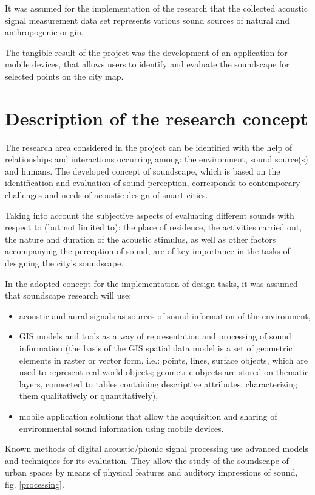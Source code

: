 \documentclass[a4paper,10pt]{article}
\begin{document}
\begin{multicols}{2}
It was assumed for the implementation of the research that the collected
acoustic signal measurement data set represents various sound sources of natural
and anthropogenic origin.

The tangible result of the project was the development of an application for
mobile devices, that allows users to identify and evaluate the soundscape for
selected points on the city map.

\end{multicols}

\section{Description of the research concept}

\begin{multicols}{2}

The research area considered in the project can be identified with the help of
relationships and interactions occurring among: the environment, sound source(s)
and humans. The developed concept of soundscape, which is based on the
identification and evaluation of sound perception, corresponds to contemporary
challenges and needs of acoustic design of smart cities.

Taking into account the subjective aspects of evaluating different sounds with
respect to (but not limited to): the place of residence, the activities carried
out, the nature and duration of the acoustic stimulus, as well as other factors
accompanying the perception of sound, are of key importance in the tasks of
designing the city's soundscape.

In the adopted concept for the implementation of design tasks, it was assumed
that soundscape research will use:
\begin{itemize}
  \item acoustic and aural signals as sources of sound information of the
    environment,
  \item GIS models and tools as a way of representation and processing of sound
    information (the basis of the GIS spatial data model is a set of geometric
    elements in raster or vector form, i.e.: points, lines, surface objects,
    which are used to represent real world objects; geometric objects are stored
    on thematic layers, connected to tables containing descriptive attributes,
    characterizing them qualitatively or quantitatively),
  \item mobile application solutions that allow the acquisition and sharing of
    environmental sound information using mobile devices.
\end{itemize}

Known methods of digital acoustic/phonic signal processing use advanced models
and techniques for its evaluation. They allow the study of the soundscape of
urban spaces by means of physical features and auditory impressions of sound,
fig. \ref{processing}.

\end{multicols}
\end{document}
